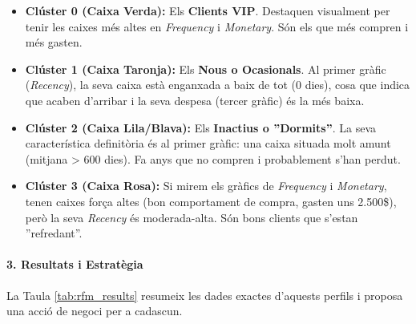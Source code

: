 \documentclass[12pt,a4paper]{article}
\begin{document}
\begin{itemize}
    \item \textbf{Clúster 0 (Caixa Verda):} Els \textbf{Clients VIP}. Destaquen visualment per tenir les caixes més altes en \textit{Frequency} i \textit{Monetary}. Són els que més compren i més gasten.
    
    \item \textbf{Clúster 1 (Caixa Taronja):} Els \textbf{Nous o Ocasionals}. Al primer gràfic (\textit{Recency}), la seva caixa està enganxada a baix de tot (0 dies), cosa que indica que acaben d'arribar i la seva despesa (tercer gràfic) és la més baixa.
    
    \item \textbf{Clúster 2 (Caixa Lila/Blava):} Els \textbf{Inactius o ''Dormits''}. La seva característica definitòria és al primer gràfic: una caixa situada molt amunt (mitjana > 600 dies). Fa anys que no compren i probablement s'han perdut.
    
    \item \textbf{Clúster 3 (Caixa Rosa):} Si mirem els gràfics de \textit{Frequency} i \textit{Monetary}, tenen caixes força altes (bon comportament de compra, gasten uns 2.500\$), però la seva \textit{Recency} és moderada-alta. Són bons clients que s'estan ''refredant''.
\end{itemize}

\paragraph{3. Resultats i Estratègia}
La Taula \ref{tab:rfm_results} resumeix les dades exactes d'aquests perfils i proposa una acció de negoci per a cadascun.

\begin{table}[H]
\centering
\caption{Perfils de Clients i Accions Recomanades}
\label{tab:rfm_results}
\end{table}
\end{document}
